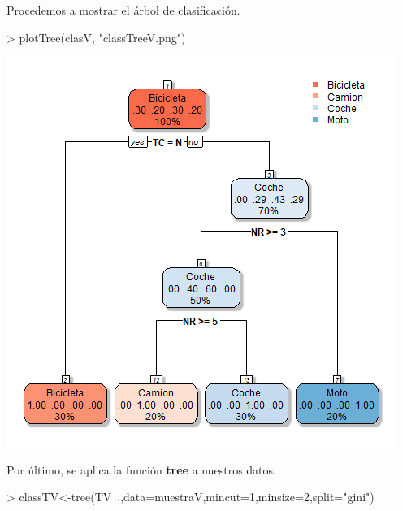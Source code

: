 \documentclass [a4paper] {article}
\begin{document}
\bigskip
Procedemos a mostrar el árbol de clasificación.
\begin{Schunk}
\begin{Sinput}
> plotTree(clasV, "classTreeV.png")
\end{Sinput}
\end{Schunk}
\includegraphics[width=\textwidth]{classTreeV}

\bigskip
Por último, se aplica la función \textbf{tree} a nuestros datos.
\begin{Schunk}
\begin{Sinput}
> classTV<-tree(TV~.,data=muestraV,mincut=1,minsize=2,split="gini")
\end{Sinput}
\end{Schunk}
\end{document}
